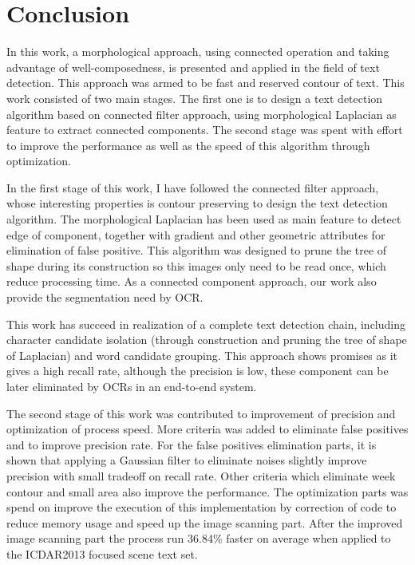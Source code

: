 
\graphicspath{ {7chapterConclusion/image/} }
\chapter{Conclusion}


In this work, a morphological approach, using connected operation and taking advantage of well-composedness, is presented and applied in the field of text detection. This approach was armed to be fast and reserved contour of text. This work consisted of two main stages. The first one is to design a text detection algorithm based on connected filter approach, using morphological Laplacian as feature to extract connected components. The second stage was spent with effort to improve the performance as well as the speed of this algorithm through optimization. 

In the first stage of this work, I have followed the connected filter approach, whose interesting properties is contour preserving to design the text detection algorithm. The morphological Laplacian has been used as main feature to detect edge of component, together with gradient and other geometric attributes for elimination of false positive. This algorithm was designed to prune the tree of shape during its construction so this images only need to be read once, which reduce processing time. As a connected component approach, our work also provide the segmentation need by OCR. 


This work has succeed in realization of a complete text detection chain, including character candidate isolation (through construction and pruning the tree of shape of Laplacian) and word candidate grouping. This approach shows promises as it gives a high recall rate, although the precision is low, these component can be later eliminated by OCRs in an end-to-end system.
  

The second stage of this work was contributed to improvement of precision and optimization of process speed. More criteria was added to eliminate false positives and to improve precision rate. For the false positives elimination parts, it is shown that applying a Gaussian filter to eliminate noises slightly improve precision with small tradeoff on recall rate. Other criteria which eliminate week contour and small area also improve the performance. The optimization parts was spend on improve the execution of this implementation by correction of code to reduce memory usage and speed up the image scanning part. After the improved image scanning part the process run 36.84\% faster on average when applied to the ICDAR2013 focused scene text set. 

